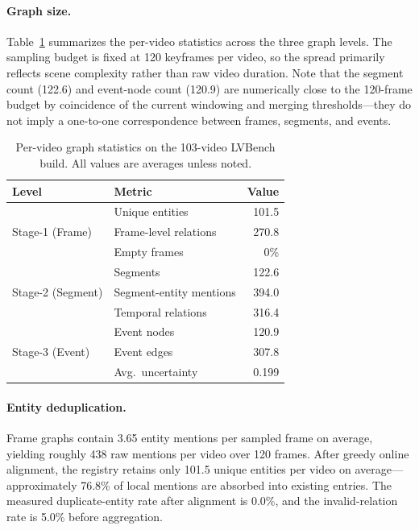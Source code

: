 \documentclass[sigconf, screen, review, anonymous]{acmart}
\begin{document}
\paragraph{Graph size.}
Table~\ref{tab:graph-stats} summarizes the per-video statistics across the three graph levels. The sampling budget is fixed at 120 keyframes per video, so the spread primarily reflects scene complexity rather than raw video duration. Note that the segment count (122.6) and event-node count (120.9) are numerically close to the 120-frame budget by coincidence of the current windowing and merging thresholds---they do not imply a one-to-one correspondence between frames, segments, and events.

\begin{table}[t]
\caption{Per-video graph statistics on the 103-video LVBench\cite{lvbench} build. All values are averages unless noted.}
\label{tab:graph-stats}
\centering
\small
\begin{tabular}{llr}
\toprule
Level & Metric & Value \\
\midrule
\multirow{3}{*}{Stage-1 (Frame)} & Unique entities & 101.5 \\
 & Frame-level relations & 270.8 \\
 & Empty frames & 0\% \\
\midrule
\multirow{3}{*}{Stage-2 (Segment)} & Segments & 122.6 \\
 & Segment-entity mentions & 394.0 \\
 & Temporal relations & 316.4 \\
\midrule
\multirow{3}{*}{Stage-3 (Event)} & Event nodes & 120.9 \\
 & Event edges & 307.8 \\
 & Avg.\ uncertainty & 0.199 \\
\bottomrule
\end{tabular}
\end{table}

\paragraph{Entity deduplication.}
Frame graphs contain 3.65 entity mentions per sampled frame on average, yielding roughly 438 raw mentions per video over 120 frames. After greedy online alignment, the registry retains only 101.5 unique entities per video on average---approximately 76.8\% of local mentions are absorbed into existing entries. The measured duplicate-entity rate after alignment is 0.0\%, and the invalid-relation rate is 5.0\% before aggregation.
\end{document}
